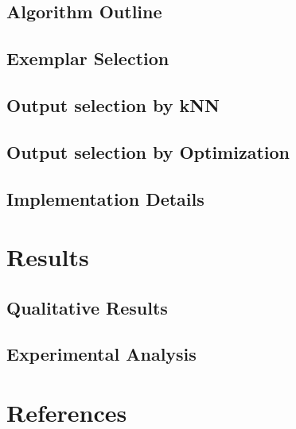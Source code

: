 \subsection{Algorithm Outline}

\subsection{Exemplar Selection}

\subsection{Output selection by kNN}

\subsection{Output selection by Optimization}

\subsection{Implementation Details}

\section{Results}

\subsection{Qualitative Results}

\subsection{Experimental Analysis}

\section{References}
